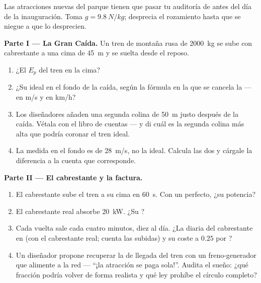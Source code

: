 \begin{problem}\label{pb:g9:energy-conversions:1}
Las atracciones nuevas del parque tienen que pasar tu auditoría de
 antes del día de la inauguración. Toma $g =
\qty{9.8}{N/kg}$; desprecia el rozamiento hasta que se niegue a que lo
desprecien.

\medskip\noindent\textbf{Parte I --- La Gran Caída.}
Un tren de montaña rusa de \qty{2000}{kg} se sube con cabrestante a una
cima de \qty{45}{m} y se suelta desde el reposo.
\begin{enumerate}
  \item ¿El $E_p$ del tren en la cima?
  \item ¿Su  ideal en el fondo de la caída, según la
        fórmula en la que se cancela la  --- en \unit{m/s} y en
        \unit{km/h}?
  \item Los diseñadores añaden una segunda colina de \qty{50}{m}
        justo después de la caída. Vétala con el libro de cuentas ---
        y di cuál es la segunda colina más alta que podría coronar el
        tren ideal.
  \item La  medida en el fondo es de \qty{28}{m/s}, no
        la ideal. Calcula las dos  y cárgale la
        diferencia a la cuenta que corresponde.
\end{enumerate}

\medskip\noindent\textbf{Parte II --- El cabrestante y la factura.}
\begin{enumerate}[resume]
  \item El cabrestante sube el tren a su cima en \qty{60}{s}. Con un
         perfecto, ¿su potencia?
  \item El cabrestante real absorbe \qty{20}{kW}. ¿Su
        ?
  \item Cada vuelta sale cada cuatro minutos, diez  al
        día. ¿La  diaria del cabrestante en
         (con el cabrestante real; cuenta las
        subidas) y su coste a $0.25$ por ?
  \item Un diseñador propone recuperar la  de llegada del
        tren con un freno-generador que alimente a la red --- ``¡la
        atracción se paga sola!''. Audita el sueño: ¿qué fracción
        podría volver de forma realista y qué ley prohíbe el círculo
        completo?
\end{enumerate}


\end{problem}
